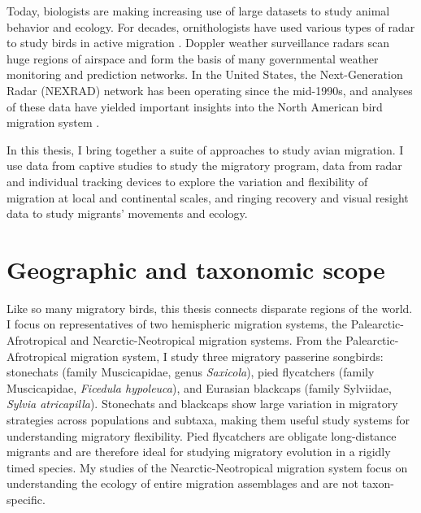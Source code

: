 \documentclass[a4paper, nobind]{templates/ociamthesis}
\begin{document}
Today, biologists are making increasing use of large datasets to study animal behavior and ecology. For decades, ornithologists have used various types of radar to study birds in active migration \autocite{gauthreauxRadarOrnithologyBiological2003}. Doppler weather surveillance radars scan huge regions of airspace and form the basis of many governmental weather monitoring and prediction networks. In the United States, the Next-Generation Radar (NEXRAD) network has been operating since the mid-1990s, and analyses of these data have yielded important insights into the North American bird migration system \autocite{gauthreauxRadarOrnithologyBiological2003,farnsworthCharacterizationAutumnNocturnal2016,dokterSeasonalAbundanceSurvival2018}.

In this thesis, I bring together a suite of approaches to study avian migration. I use data from captive studies to study the migratory program, data from radar and individual tracking devices to explore the variation and flexibility of migration at local and continental scales, and ringing recovery and visual resight data to study migrants' movements and ecology.

\hypertarget{geographic-and-taxonomic-scope}{%
\section*{Geographic and taxonomic scope}\label{geographic-and-taxonomic-scope}}

Like so many migratory birds, this thesis connects disparate regions of the world. I focus on representatives of two hemispheric migration systems, the Palearctic-Afrotropical and Nearctic-Neotropical migration systems. From the Palearctic-Afrotropical migration system, I study three migratory passerine songbirds: stonechats (family Muscicapidae, genus \emph{Saxicola}), pied flycatchers (family Muscicapidae, \emph{Ficedula hypoleuca}), and Eurasian blackcaps (family Sylviidae, \emph{Sylvia atricapilla}). Stonechats and blackcaps show large variation in migratory strategies across populations and subtaxa, making them useful study systems for understanding migratory flexibility. Pied flycatchers are obligate long-distance migrants and are therefore ideal for studying migratory evolution in a rigidly timed species. My studies of the Nearctic-Neotropical migration system focus on understanding the ecology of entire migration assemblages and are not taxon-specific.
\end{document}
